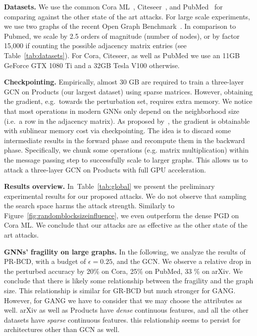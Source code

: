 \documentclass[letterpaper]{article} %
\begin{document}
\textbf{Datasets.} We use the common Cora ML~\citep{Bojchevski2018}, Citeseer~\citep{McCallum2000}, and PubMed~\citep{Sen2008} for comparing against the other state of the art attacks. For large scale experiments, we use two graphs of the recent Open Graph Benchmark~\citep{Hu2020}. In comparison to Pubmed, we scale by 2.5 orders of magnitude (number of nodes), or by factor 15,000 if counting the possible adjacency matrix entries (see Table~\ref{tab:datasets}). For Cora, Citeseer, as well as PubMed we use an 11GB GeForce GTX 1080 Ti and a 32GB Tesla V100 otherwise.

\textbf{Checkpointing.} Empirically, almost 30 GB are required to train a three-layer GCN on Products (our largest dataset) using sparse matrices. However, obtaining the gradient, e.g.\ towards the perturbation set, requires extra memory. We notice that most operations in modern GNNs only depend on the neighborhood size (i.e.~a row in the adjacency matrix). As proposed by~\citet{Chen2016}, the gradient is obtainable with sublinear memory cost via checkpointing. The idea is to discard some intermediate results in the forward phase and recompute them in the backward phase. Specifically, we chunk some operations (e.g. matrix multiplication) within the message passing step to successfully scale to larger graphs. This allows us to attack a three-layer GCN on Products with full GPU acceleration.

\textbf{Results overview.} In~Table~\ref{tab:global} we present the preliminary experimental results for our proposed attacks. We do not observe that sampling the search space harms the attack strength. Similarly to Figure~\ref{fig:randomblocksizeinfluence}, we even outperform the dense PGD on Cora ML. We conclude that our attacks are as effective as the other state of the art attacks.

\textbf{GNNs' fragility on large graphs.} In the following, we analyze the results of PR-BCD, with a budget of \(\epsilon=0.25\), and the GCN. We observe a relative drop in the perturbed accuracy by 20\% on Cora, 25\% on PubMed, 33 \% on arXiv. We conclude that there is likely some relationship between the fragility and the graph size. This relationship is similar for GR-BCD but much stronger for GANG. However, for GANG we have to consider that we may choose the attributes as well. arXiv as well as Products have \textit{dense} continuous features, and all the other datasets have \textit{sparse} continuous features. this relationship seems to persist for architectures other than GCN as well.
\end{document}
